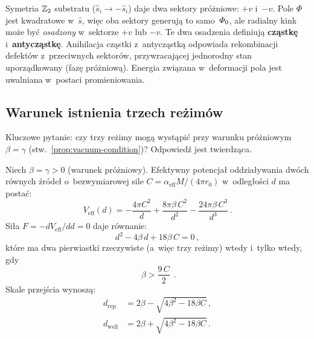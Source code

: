 \begin{remark}%
\label{rem:antyczastka}
Symetria $\mathbb{Z}_2$ substratu ($\hat{s}_i \to -\hat{s}_i$) daje dwa
sektory pr\'o\.zniowe: $+v$ i~$-v$. Pole $\Phi$ jest kwadratowe
w~$\hat{s}$, wi\k{e}c oba sektory generuj\k{a} to samo~$\varPhi_0$,
ale radialny kink mo\.ze by\'c \emph{osadzony} w~sektorze $+v$
lub $-v$. Te dwa osadzenia definiuj\k{a} \textbf{cz\k{a}stk\k{e}}
i~\textbf{antycz\k{a}stk\k{e}}. Anihilacja cz\k{a}stki
z~antycz\k{a}stk\k{a} odpowiada rekombinacji defekt\'ow
z~przeciwnych sektor\'ow, przywracaj\k{a}cej jednorodny stan
uporz\k{a}dkowany (faz\k{e} pr\'o\.zniow\k{a}). Energia
zwi\k{a}zana w~deformacji pola jest uwalniana
w~postaci promieniowania.
\end{remark}

\subsection{Warunek istnienia trzech re\.zim\'ow}\label{ssec:trzy-rezimy-warunek}

Kluczowe pytanie: czy trzy re\.zimy mog\k{a} wyst\k{a}pi\'c
przy warunku pr\'o\.zniowym $\beta = \gamma$
(stw.~\ref{prop:vacuum-condition})? Odpowied\'z jest twierdz\k{a}ca.

\begin{proposition}[Trzy re\.zimy przy $\beta = \gamma$]%
\label{prop:trzy-rezimy-beta-gamma}
Niech $\beta = \gamma > 0$ (warunek pr\'o\.zniowy). Efektywny
potencja\l{} oddzia\l{}ywania dw\'och r\'ownych \'zr\'ode\l{}
o~bezwymiarowej sile $C = \alpha_{\mathrm{eff}} M / (4\pi r_0)$
w~odleg\l{}o\'sci $d$ ma posta\'c:
\begin{equation}\label{eq:Veff-beta-eq-gamma}
  V_{\mathrm{eff}}(d)
  = -\frac{4\pi C^2}{d}
    + \frac{8\pi\beta\, C^2}{d^2}
    - \frac{24\pi\beta\, C^3}{d^3}\,.
\end{equation}
Si\l{}a $F = -dV_{\mathrm{eff}}/dd = 0$ daje r\'ownanie:
\begin{equation}\label{eq:force-zeros}
  d^2 - 4\beta\, d + 18\beta\, C = 0\,,
\end{equation}
kt\'ore ma dwa pierwiastki rzeczywiste (a~wi\k{e}c trzy re\.zimy)
wtedy i~tylko wtedy, gdy
\begin{equation}\label{eq:trzy-rezimy-warunek}
  \boxed{\;\beta > \frac{9\,C}{2}\;}\,.
\end{equation}
Skale przej\'scia wynosz\k{a}:
\begin{align}
  d_{\mathrm{rep}} &= 2\beta - \sqrt{4\beta^2 - 18\beta C}\,,
  \label{eq:d-rep}\\
  d_{\mathrm{well}} &= 2\beta + \sqrt{4\beta^2 - 18\beta C}\,.
  \label{eq:d-well}
\end{align}
\end{proposition}

